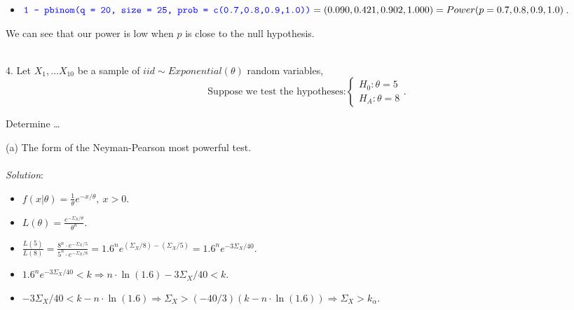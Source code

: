 \documentclass[12pt]{article}
\newcommand{\XB}{\color{black}}
\newcommand{\XBB}{\color{blue}}
\newcommand{\ds}{\displaystyle}
\begin{document}
\begin{itemize}
    \item $ \ds {\XBB \texttt{1 - pbinom(q = 20, size = 25, prob = c(0.7,0.8,0.9,1.0))}} \\ = (0.090, 0.421, 0.902, 1.000) = Power(p = 0.7, 0.8, 0.9, 1.0) $.
\end{itemize}

\noindent
We can see that our power is low when $ p $ is close to the null hypothesis. \\

\vspace{2.5mm}

\newpage
\XBB\hrulefill\XB \\

4. Let $ \ds X_{1}, \dots X_{10} $ be a sample of $ iid \sim Exponential(\theta) $ random variables, \\

\[
    \text{Suppose we test the hypotheses:}
    \left\{
        \begin{array}{rl}
            H_{0} : \theta = 5 \\
            H_{A} : \theta = 8
        \end{array}.
    \right.
\]

Determine \dots \\

\XBB\hrulefill\XB
\vspace{5mm}

(a) The form of the Neyman-Pearson most powerful test. \\
\vspace{2.5mm} \\
\textit{Solution}:
\vspace{2.5mm} \\

\begin{itemize}
    \item $ \ds f(x | \theta) = \frac{1}{\theta}e^{-x / \theta} , \ x > 0 $.
    \item $ \ds L(\theta) = \frac{e^{-\Sigma_{X} / \theta}}{\theta^{n}} $.
    \item $ \ds \frac{L(5)}{L(8)} = \frac{8^{n} \cdot e^{-\Sigma_{X} / 5}}{5^{n} \cdot e^{-\Sigma_{X} / 8}} = 1.6^{n} e^{(\Sigma_{X} / 8) - (\Sigma_{X} / 5)} = 1.6^{n} e^{-3\Sigma_{X} / 40} $.
    \item $ \ds 1.6^{n} e^{-3\Sigma_{X} / 40} < k \Rightarrow n \cdot \ln(1.6) -3\Sigma_{X} / 40 < k $.
    \item $ \ds -3\Sigma_{X} / 40 < k - n \cdot \ln(1.6) \Rightarrow \Sigma_{X} > (-40/3)(k - n \cdot \ln(1.6)) \Rightarrow \Sigma_{X} > k_{\alpha} $.
\end{itemize}
\end{document}

